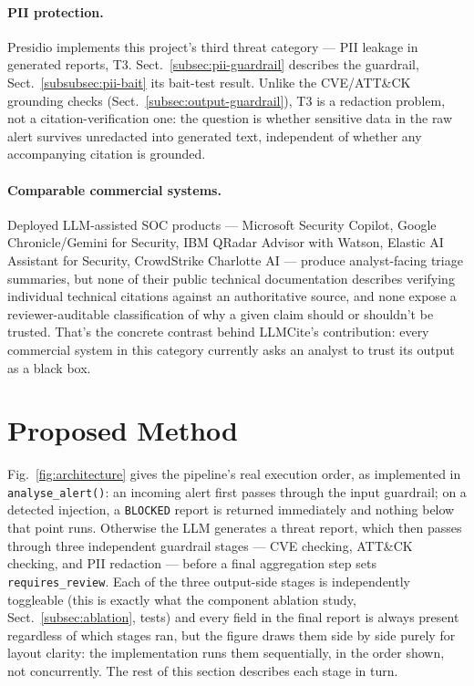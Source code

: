 \documentclass[pdflatex,sn-mathphys-num]{sn-jnl}%
\begin{document}
\paragraph{PII protection.} Presidio \cite{presidio2023} implements this
project's third threat category --- PII leakage in generated reports,
T3. Sect.~\ref{subsec:pii-guardrail} describes the guardrail,
Sect.~\ref{subsubsec:pii-bait} its bait-test result. Unlike the
CVE/ATT\&CK grounding checks (Sect.~\ref{subsec:output-guardrail}), T3
is a redaction problem, not a citation-verification one: the question is
whether sensitive data in the raw alert survives unredacted into
generated text, independent of whether any accompanying citation is
grounded.

\paragraph{Comparable commercial systems.} Deployed LLM-assisted SOC
products --- Microsoft Security Copilot, Google Chronicle/Gemini for
Security, IBM QRadar Advisor with Watson, Elastic AI Assistant for
Security, CrowdStrike Charlotte AI --- produce analyst-facing triage
summaries, but none of their public technical documentation describes
verifying individual technical citations against an authoritative
source, and none expose a reviewer-auditable classification of why a
given claim should or shouldn't be trusted. That's the concrete contrast
behind LLMCite's contribution: every commercial system in this category
currently asks an analyst to trust its output as a black box.

\section{Proposed Method}\label{sec:method}

Fig.~\ref{fig:architecture} gives the pipeline's real execution order, as
implemented in \texttt{analyse\_alert()}: an incoming alert first passes
through the input guardrail; on a detected injection, a
\texttt{BLOCKED} report is returned immediately and nothing below that
point runs. Otherwise the LLM generates a threat report, which then
passes through three independent guardrail stages --- CVE checking,
ATT\&CK checking, and PII redaction --- before a final aggregation step
sets \texttt{requires\_review}. Each of the three output-side stages is
independently toggleable (this is exactly what the component ablation
study, Sect.~\ref{subsec:ablation}, tests) and every field in the final
report is always present regardless of which stages ran, but the figure
draws them side by side purely for layout clarity: the implementation
runs them sequentially, in the order shown, not concurrently. The rest
of this section describes each stage in turn.
\end{document}
